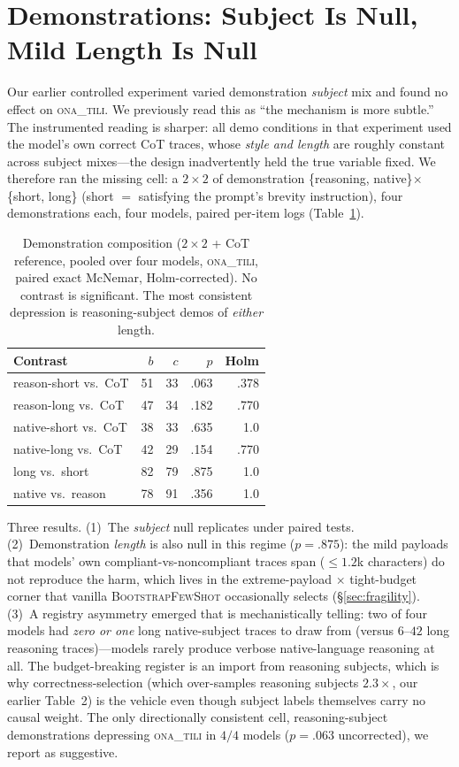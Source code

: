 \documentclass[11pt]{article}
\newcommand{\ona}{\textsc{ona\_tili}}
\newcommand{\bsfs}{\textsc{BootstrapFewShot}}
\begin{document}
\section{Demonstrations: Subject Is Null, Mild Length Is Null}\label{sec:demos}

Our earlier controlled experiment varied demonstration \emph{subject} mix and found
no effect on \ona{}. We previously read this as ``the mechanism is more subtle.'' The
instrumented reading is sharper: all demo conditions in that experiment used the
model's own correct CoT traces, whose \emph{style and length} are roughly constant
across subject mixes---the design inadvertently held the true variable fixed. We
therefore ran the missing cell: a $2{\times}2$ of demonstration
\{reasoning, native\}$\times$\{short, long\} (short $=$ satisfying the prompt's
brevity instruction), four demonstrations each, four models, paired per-item logs
(Table~\ref{tab:demolab}).

\begin{table}[t]\centering\small
\caption{Demonstration composition ($2{\times}2$ + CoT reference, pooled over four
models, \ona{}, paired exact McNemar, Holm-corrected). No contrast is significant.
The most consistent depression is reasoning-subject demos of \emph{either} length.}
\label{tab:demolab}
\setlength{\tabcolsep}{4pt}
\begin{tabular}{lrrrr}
\toprule
Contrast & $b$ & $c$ & $p$ & Holm \\
\midrule
reason-short vs.\ CoT & 51 & 33 & .063 & .378 \\
reason-long vs.\ CoT  & 47 & 34 & .182 & .770 \\
native-short vs.\ CoT & 38 & 33 & .635 & 1.0 \\
native-long vs.\ CoT  & 42 & 29 & .154 & .770 \\
long vs.\ short       & 82 & 79 & .875 & 1.0 \\
native vs.\ reason    & 78 & 91 & .356 & 1.0 \\
\bottomrule
\end{tabular}
\end{table}

Three results. (1)~The \emph{subject} null replicates under paired tests.
(2)~Demonstration \emph{length} is also null in this regime ($p{=}.875$): the mild
payloads that models' own compliant-vs-noncompliant traces span (${\le}1.2$k
characters) do not reproduce the harm, which lives in the extreme-payload
$\times$ tight-budget corner that vanilla \bsfs{} occasionally selects
(\S\ref{sec:fragility}). (3)~A registry asymmetry emerged that is mechanistically
telling: two of four models had \emph{zero or one} long native-subject traces to
draw from (versus $6$--$42$ long reasoning traces)---models rarely produce verbose
native-language reasoning at all. The budget-breaking register is an import from
reasoning subjects, which is why correctness-selection (which over-samples reasoning
subjects $2.3\times$, our earlier Table~2) is the vehicle even though subject labels
themselves carry no causal weight. The only directionally consistent cell,
reasoning-subject demonstrations depressing \ona{} in $4/4$ models
($p{=}.063$ uncorrected), we report as suggestive.
\end{document}
